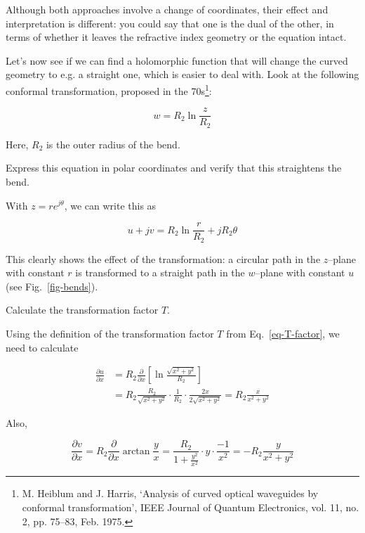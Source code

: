 Although both approaches involve a change of coordinates, their effect and interpretation is different: you could say that one is the dual of the other, in terms of whether it leaves the refractive index geometry or the equation intact.

Let's now see if we can find a holomorphic function that will change the curved geometry to e.g. a straight one, which is easier to deal with. Look at the following conformal transformation, proposed in the 70s\footnote{M. Heiblum and J. Harris, ‘Analysis of curved optical waveguides by conformal transformation’, IEEE Journal of Quantum Electronics, vol. 11, no. 2, pp. 75–83, Feb. 1975.}:

\begin{equation}
w = R_2 \ln \frac{z}{R_2}
\end{equation} 

Here, $R_2$ is the outer radius of the bend.

\begin{cue}
Express this equation in polar coordinates and verify that this straightens the bend.  
\end{cue}

With $z=r e^{j \theta}$, we can write this as

\begin{equation}
u + jv = R_2 \ln \frac{r}{R_2} + j R_2 \theta
\label{eq-con-trans-bend}
\end{equation} 

This clearly shows the effect of the transformation: a circular path in the $z$--plane with constant $r$ is transformed to a straight path in the $w$--plane with constant $u$ (see Fig.~\ref{fig-bends}).

\begin{cue}
Calculate the transformation factor $T$. 
\end{cue}

Using the definition of the transformation factor $T$ from Eq.~\ref{eq-T-factor}, we need to calculate

\begin{align}
\frac{\partial u}{\partial x} &= R_2 \frac{\partial }{\partial x} \left[ \ln \frac{\sqrt{x^2+y^2}}{R_2} \right] \nonumber \\
&= R_2 \frac{R_2}{\sqrt{x^2+y^2}} \cdot \frac{1}{R_2} \cdot \frac{2x}{2\sqrt{x^2+y^2}} = R_2 \frac{x}{x^2+y^2}
\end{align} 

Also,

\begin{equation}
\frac{\partial v}{\partial x} = R_2 \frac{\partial}{\partial x} \arctan
\frac{y}{x} = \frac{R_2}{1 + \frac{y^2}{x^2}} \cdot y \cdot \frac{-1}{x^2}= -R_2
\frac{y}{x^2+y^2}
\end{equation} 

